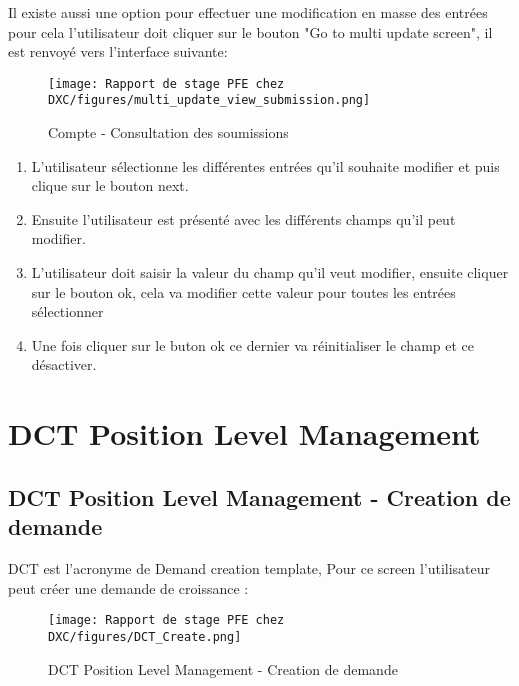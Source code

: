 Il existe aussi une option pour effectuer une modification en masse des entrées pour cela l'utilisateur doit cliquer sur le bouton "Go to multi update screen", il est renvoyé vers l'interface suivante:

\begin{figure}[H]
    \centering
    \texttt{[image: Rapport de stage PFE chez DXC/figures/multi\_update\_view\_submission.png]}
    \caption{Compte - Consultation des soumissions}
\end{figure}

\begin{enumerate}
    
    \item L'utilisateur sélectionne les différentes entrées qu'il souhaite modifier et puis clique sur le bouton next.
    \vspace{0.1cm}
    \item Ensuite l'utilisateur est présenté avec les différents champs qu'il peut modifier.
    \vspace{0.1cm}
    \item L'utilisateur doit saisir la valeur du champ qu'il veut modifier, ensuite cliquer sur le bouton ok, cela va modifier cette valeur pour toutes les entrées sélectionner
    \vspace{0.1cm}
    \item Une fois cliquer sur le buton ok ce dernier va réinitialiser le champ et ce désactiver.

\end{enumerate}

\section{DCT Position Level Management}

\subsection{DCT Position Level Management - Creation de demande}

DCT est l'acronyme de Demand creation template, Pour ce screen l'utilisateur peut créer une demande de croissance : 

\begin{figure}[H]
    \centering
    \texttt{[image: Rapport de stage PFE chez DXC/figures/DCT\_Create.png]}
    \caption{DCT Position Level Management - Creation de demande }
\end{figure}


